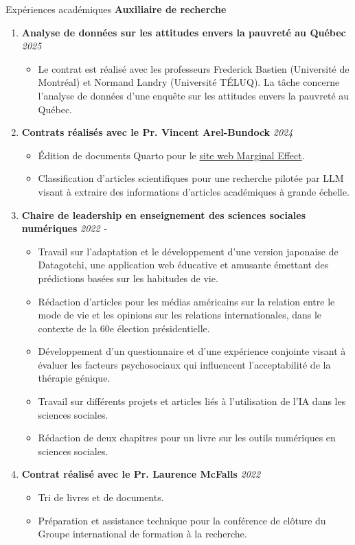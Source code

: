 \documentclass{resume} %
\begin{document}
\begin{rSection}{Expériences académiques}
{\bf Auxiliaire de recherche}
\begin{enumerate}
    \item \textbf{Analyse de données sur les attitudes envers la pauvreté au Québec} \hfill {\em 2025}
        \begin{itemize}
            \item Le contrat est réalisé avec les professeurs Frederick Bastien (Université de Montréal) et Normand Landry (Université TÉLUQ). La tâche concerne l'analyse de données d'une enquête sur les attitudes envers la pauvreté au Québec.
        \end{itemize}
    \item \textbf{Contrats réalisés avec le Pr. Vincent Arel-Bundock} \hfill {\em 2024}
        \begin{itemize}
          \item Édition de documents Quarto pour le \href{https://marginaleffects.com}{site web Marginal Effect}.
            \item Classification d'articles scientifiques pour une recherche pilotée par LLM visant à extraire des informations d'articles académiques à grande échelle.
        \end{itemize}
    \item \textbf{Chaire de leadership en enseignement des sciences sociales numériques} \hfill {\em 2022 -}
        \begin{itemize}
            \item {Travail sur l'adaptation et le développement d'une version japonaise de Datagotchi, une application web éducative et amusante émettant des prédictions basées sur les habitudes de vie.}
            \item Rédaction d'articles pour les médias américains sur la relation entre le mode de vie et les opinions sur les relations internationales, dans le contexte de la 60e élection présidentielle. 
            \item Développement d'un questionnaire et d'une expérience conjointe visant à évaluer les facteurs psychosociaux qui influencent l'acceptabilité de la thérapie génique.
            \item Travail sur différents projets et articles liés à l'utilisation de l'IA dans les sciences sociales.
            \item Rédaction de deux chapitres pour un livre sur les outils numériques en sciences sociales.
        \end{itemize}
    \item \textbf{Contrat réalisé avec le Pr. Laurence McFalls} \hfill {\em 2022}
        \begin{itemize}
            \item Tri de livres et de documents.
            \item Préparation et assistance technique pour la conférence de clôture du Groupe international de formation à la recherche.
        \end{itemize}
\end{enumerate}

\end{rSection}
\end{document}
